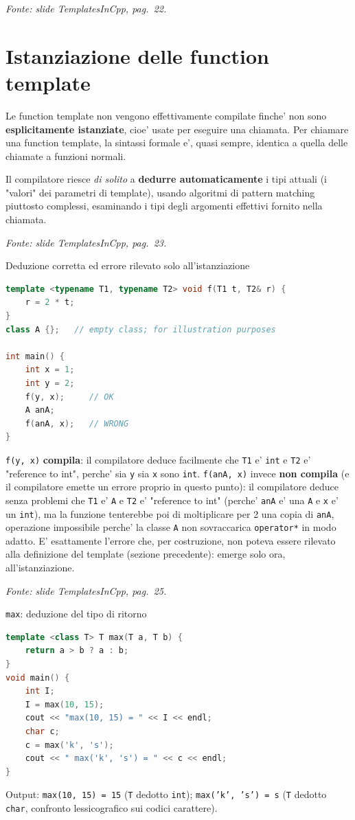\documentclass{report}
\newcommand{\code}[1]{\texttt{\small #1}}
\newcommand{\fonteslide}[1]{{\footnotesize\itshape\color{gray} Fonte: slide \emph{TemplatesInCpp}, pag.~#1.\par}}
\begin{document}
\fonteslide{22}

\section{Istanziazione delle function template}

Le function template non vengono effettivamente compilate finche' non sono
\textbf{esplicitamente istanziate}, cioe' usate per eseguire una chiamata.
Per chiamare una function template, la sintassi formale e', quasi sempre,
identica a quella delle chiamate a funzioni normali.

Il compilatore riesce \emph{di solito} a \textbf{dedurre automaticamente} i
tipi attuali (i "valori" dei parametri di template), usando algoritmi di
pattern matching piuttosto complessi, esaminando i tipi degli argomenti
effettivi fornito nella chiamata.

\fonteslide{23}

\begin{Example}{Deduzione corretta ed errore rilevato solo all'istanziazione}{}
\begin{lstlisting}[language=C++]
template <typename T1, typename T2> void f(T1 t, T2& r) {
    r = 2 * t;
}
class A {};   // empty class; for illustration purposes

int main() {
    int x = 1;
    int y = 2;
    f(y, x);     // OK
    A anA;
    f(anA, x);   // WRONG
}
\end{lstlisting}
\code{f(y, x)} \textbf{compila}: il compilatore deduce facilmente che
\code{T1} e' \code{int} e \code{T2} e' "reference to int", perche' sia
\code{y} sia \code{x} sono \code{int}. \code{f(anA, x)} invece
\textbf{non compila} (e il compilatore emette un errore proprio in questo
punto): il compilatore deduce senza problemi che \code{T1} e' \code{A} e
\code{T2} e' "reference to int" (perche' \code{anA} e' una \code{A} e
\code{x} e' un \code{int}), ma la funzione tenterebbe poi di moltiplicare
per 2 una copia di \code{anA}, operazione impossibile perche' la classe
\code{A} non sovraccarica \code{operator*} in modo adatto. E' esattamente
l'errore che, per costruzione, non poteva essere rilevato alla definizione
del template (sezione precedente): emerge solo ora, all'istanziazione.
\end{Example}

\fonteslide{25}

\begin{Example}{\code{max}: deduzione del tipo di ritorno}{}
\begin{lstlisting}[language=C++]
template <class T> T max(T a, T b) {
    return a > b ? a : b;
}
void main() {
    int I;
    I = max(10, 15);
    cout << "max(10, 15) = " << I << endl;
    char c;
    c = max('k', 's');
    cout << " max('k', 's') = " << c << endl;
}
\end{lstlisting}
Output: \code{max(10, 15) = 15} (\code{T} dedotto \code{int}); \code{max('k',
's') = s} (\code{T} dedotto \code{char}, confronto lessicografico sui codici
carattere).
\end{Example}
\end{document}
